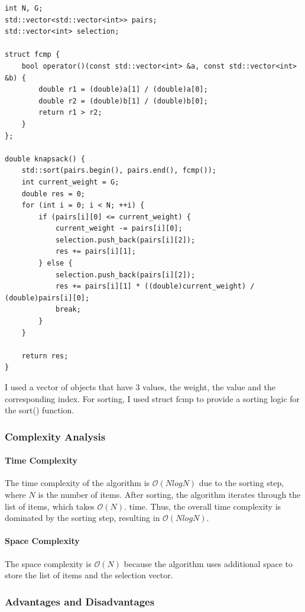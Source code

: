 \documentclass{llncs}
\begin{document}
\begin{lstlisting}
int N, G;
std::vector<std::vector<int>> pairs;
std::vector<int> selection;

struct fcmp {
    bool operator()(const std::vector<int> &a, const std::vector<int> &b) {
        double r1 = (double)a[1] / (double)a[0];
        double r2 = (double)b[1] / (double)b[0];
        return r1 > r2;
    }
};

double knapsack() {
    std::sort(pairs.begin(), pairs.end(), fcmp());
    int current_weight = G;
    double res = 0;
    for (int i = 0; i < N; ++i) {
        if (pairs[i][0] <= current_weight) {
            current_weight -= pairs[i][0];
            selection.push_back(pairs[i][2]);
            res += pairs[i][1];
        } else {
            selection.push_back(pairs[i][2]);
            res += pairs[i][1] * ((double)current_weight) / (double)pairs[i][0];
            break;
        }
    }

    return res;
}
\end{lstlisting}

I used a vector of objects that have 3 values, the weight, the value and the corresponding index.
For sorting, I used struct fcmp to provide a sorting logic for the sort() function.


\subsubsection{Complexity Analysis}
\paragraph{Time Complexity}
The time complexity of the algorithm is $\mathcal{O}(NlogN)$ due to the sorting step, where $N$ is
the number of items. After sorting, the algorithm iterates through the list of items, which takes $\mathcal{O}(N)$.
time. Thus, the overall time complexity is dominated by the sorting step, resulting in 
$\mathcal{O}(NlogN)$.

\paragraph{Space Complexity}
The space complexity is $\mathcal{O}(N)$ because the algorithm uses additional space to store the
list of items and the selection vector.

\subsubsection{Advantages and Disadvantages}
\end{document}
